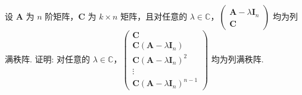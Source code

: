 \documentclass[../../main.tex]{subfiles}%
\begin{document}
\begin{example}
设 $\boldsymbol{A}$ 为 $n$ 阶矩阵，$\boldsymbol{C}$ 为 $k\times n$ 矩阵，且对任意的 $\lambda\in\mathbb{C}$，$\begin{pmatrix}
\boldsymbol{A}-\lambda\boldsymbol{I}_n \\
\boldsymbol{C}
\end{pmatrix}$ 均为列满秩阵. 证明: 对任意的 $\lambda\in\mathbb{C}$，$\begin{pmatrix}
\boldsymbol{C} \\
\boldsymbol{C}(\boldsymbol{A}-\lambda\boldsymbol{I}_n) \\
\boldsymbol{C}(\boldsymbol{A}-\lambda\boldsymbol{I}_n)^2 \\
\vdots \\
\boldsymbol{C}(\boldsymbol{A}-\lambda\boldsymbol{I}_n)^{n - 1}
\end{pmatrix}$ 均为列满秩阵.
\end{example}
\end{document}

